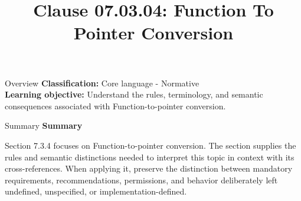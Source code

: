 \documentclass[10pt,letterpaper]{article}
\title{Clause 07.03.04: Function To Pointer Conversion}
\author{}
\date{}
\begin{document}
\maketitle
\begin{CornellOverviewBox}{Overview}
\textbf{Classification:} Core language - Normative\\[2pt]
\textbf{Learning objective:} Understand the rules, terminology, and semantic consequences associated with Function-to-pointer conversion.
\end{CornellOverviewBox}\begin{CornellSummaryBox}{Summary}
{\sffamily\bfseries\color{Accent} Summary}\par\vspace{3pt}Section 7.3.4 focuses on Function-to-pointer conversion. The section supplies the rules and semantic distinctions needed to interpret this topic in context with its cross-references. When applying it, preserve the distinction between mandatory requirements, recommendations, permissions, and behavior deliberately left undefined, unspecified, or implementation-defined.
\end{CornellSummaryBox}
\end{document}
